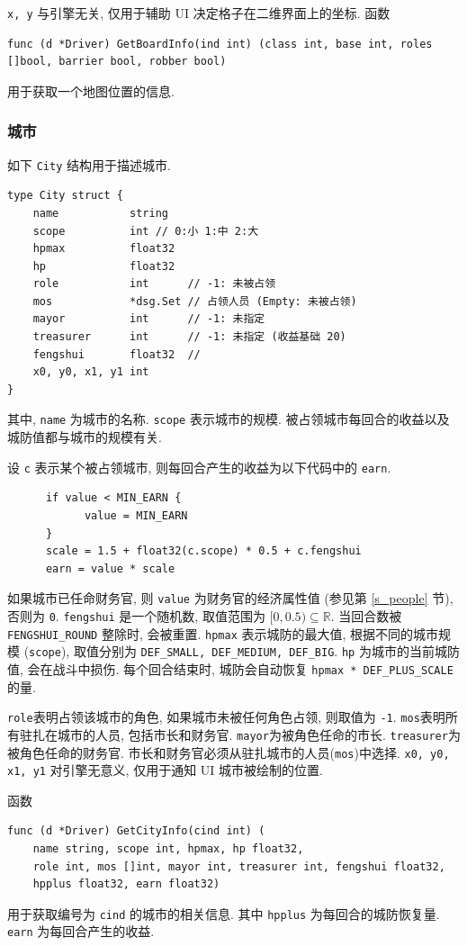 \documentclass[UTF8, zihao=-4]{ctexart} %
\newcommand{\real}{\mathbb{R}} %
\newcommand{\lcode}{\lstinline} % 段内插入代码
\begin{document}
\lcode{x, y} 与引擎无关, 仅用于辅助 UI 决定格子在二维界面上的坐标.
函数
\begin{lstlisting}
func (d *Driver) GetBoardInfo(ind int) (class int, base int, roles []bool, barrier bool, robber bool)
\end{lstlisting}
用于获取一个地图位置的信息.

\subsubsection{城市}
如下 \lcode{City} 结构用于描述城市.
\begin{lstlisting}
type City struct {
	name           string
	scope          int // 0:小 1:中 2:大
	hpmax          float32
	hp             float32
	role           int      // -1: 未被占领
	mos            *dsg.Set // 占领人员 (Empty: 未被占领)
	mayor          int      // -1: 未指定
	treasurer      int      // -1: 未指定 (收益基础 20)
	fengshui       float32  //
	x0, y0, x1, y1 int
}
\end{lstlisting}
其中, \lcode{name} 为城市的名称.
\lcode{scope} 表示城市的规模. 被占领城市每回合的收益以及城防值都与城市的规模有关.

设 \lcode{c} 表示某个被占领城市, 则每回合产生的收益为以下代码中的 \lcode{earn}.
\begin{lstlisting}
      if value < MIN_EARN {
            value = MIN_EARN
      }
      scale = 1.5 + float32(c.scope) * 0.5 + c.fengshui
      earn = value * scale
\end{lstlisting}
如果城市已任命财务官, 则 \lcode{value} 为财务官的经济属性值 (参见第 \ref{s_people} 节), 否则为 \lcode{0}. 
\lcode{fengshui} 是一个随机数, 取值范围为 $[0, 0.5) \subseteq \real$.
当回合数被 \lcode{FENGSHUI_ROUND} 整除时, 会被重置.
\lcode{hpmax} 表示城防的最大值, 根据不同的城市规模 (\lcode{scope}), 
取值分别为 \lcode{DEF_SMALL, DEF_MEDIUM, DEF_BIG}. \lcode{hp} 为城市的当前城防值,
会在战斗中损伤. 每个回合结束时, 城防会自动恢复 \lcode{hpmax * DEF_PLUS_SCALE} 的量.

\lcode{role}表明占领该城市的角色, 如果城市未被任何角色占领, 则取值为 \lcode{-1}.
\lcode{mos}表明所有驻扎在城市的人员, 包括市长和财务官.
\lcode{mayor}为被角色任命的市长.
\lcode{treasurer}为被角色任命的财务官.
市长和财务官必须从驻扎城市的人员(\lcode{mos})中选择.
\lcode{x0, y0, x1, y1} 对引擎无意义, 仅用于通知 UI 城市被绘制的位置.

函数
\begin{lstlisting}
func (d *Driver) GetCityInfo(cind int) (
	name string, scope int, hpmax, hp float32,
	role int, mos []int, mayor int, treasurer int, fengshui float32,
	hpplus float32, earn float32)
\end{lstlisting}
用于获取编号为 \lcode{cind} 的城市的相关信息. 其中 \lcode{hpplus} 为每回合的城防恢复量.
\lcode{earn} 为每回合产生的收益.
\end{document}
